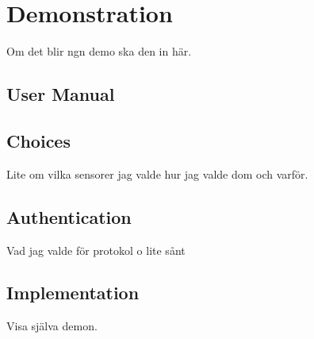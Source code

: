 \chapter{Demonstration}\label{cha:demo}
Om det blir ngn demo ska den in här.

\section{User Manual}\label{manual}

\section{Choices}
Lite om vilka sensorer jag valde hur jag valde dom och varför.

\section{Authentication}
Vad jag valde för protokol o lite sånt

\section{Implementation}
Visa själva demon.

